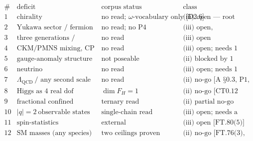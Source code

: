 \documentclass[11pt,openany]{report}
\theoremstyle{canonplain}
\theoremstyle{canondef}
\begin{document}
\[
\begin{array}{c|l|l|l}
\# & \text{deficit} & \text{corpus status} & \text{class}\\
\hline
1 & \text{chirality (Weyl/projector)} & \text{no read; }\omega\text{-vocabulary only [D2.6]} & \text{(iii) open — root deficit}\\
2 & \text{Yukawa sector / fermion masses} & \text{no read; no P4 parameter} & \text{(iii) open, constrained by P1/P4}\\
3 & \text{three generations / flavour} & \text{no read } & \text{(iii) open}\\
4 & \text{CKM/PMNS mixing, CP phase} & \text{no read} & \text{(iii) open; needs 1 and 3}\\
5 & \text{gauge-anomaly structure} & \text{not poseable} & \text{(ii) blocked by 1}\\
6 & \text{neutrino species/mass/mixing} & \text{no read} & \text{(iii) open; needs 1 and 3}\\
7 & \Lambda_{\mathrm{QCD}}\ \text{/ any second scale} & \text{no read} & \text{(ii) no-go [A §0.3, P1, P5]}\\
8 & \text{Higgs as }4\text{ real dof} & \dim F_H=1 & \text{(ii) no-go [CT0.12 allocation]}\\
9 & \text{fractional confined charges} & \text{ternary read} & \text{(ii) partial no-go [EM.9, CT3.22]}\\
10 & |q|=2\ \text{observable states} & \text{single-chain read} & \text{(iii) open; needs a multi-chain read}\\
11 & \text{spin-statistics} & \text{external} & \text{(iii) open [FT.80(5)]}\\
12 & \text{SM masses (any species)} & \text{two ceilings proven} & \text{(ii) no-go [FT.76(3), FT.79(2)]}
\end{array}
\]
\end{document}
